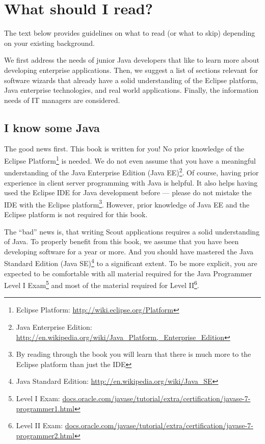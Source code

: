 \documentclass[a4paper,10pt,twoside]{book}
\begin{document}
\section{What should I read?} 

The text below provides guidelines on what to read (or what to skip) depending on your existing background.

We first address the needs of junior Java developers that like to learn more about developing enterprise applications.
Then, we suggest a list of sections relevant for software wizards that already have a solid understanding of the Eclipse platform, Java enterprise technologies, and real world applications.
Finally, the information needs of IT managers are considered.

\subsection{I know some Java}

The good news first.
This book is written for you! 
No prior knowledge of the Eclipse Platform\footnote{Eclipse Platform: \url{http://wiki.eclipse.org/Platform}} is needed. 
We do not even assume that you have a meaningful understanding of the Java Enterprise Edition 
(Java EE)\footnote{Java Enterprise Edition: \url{http://en.wikipedia.org/wiki/Java_Platform,_Enterprise_Edition}}.
Of course, having prior experience in client server programming with Java is helpful.
It also helps having used the Eclipse IDE for Java development before --- please do not mistake the IDE with the Eclipse 
platform\footnote{By reading through the book you will learn that there is much more to the Eclipse platform than just the IDE}.
However, prior knowledge of Java EE and the Eclipse platform is not required for this book.

The ``bad'' news is, that writing Scout applications requires a solid understanding of Java.
To properly benefit from this book, we assume that you have been developing software for a year or more.
And you should have mastered the Java Standard Edition 
(Java SE)\footnote{Java Standard Edition: \url{http://en.wikipedia.org/wiki/Java_SE}} to a significant extent. 
To be more explicit, you are expected to be comfortable with all material required for the Java Programmer Level I 
Exam\footnote{Level I Exam: \url{docs.oracle.com/javase/tutorial/extra/certification/javase-7-programmer1.html}}
and most of the material required for 
Level II\footnote{Level II Exam: \url{docs.oracle.com/javase/tutorial/extra/certification/javase-7-programmer2.html}}.
\end{document}
